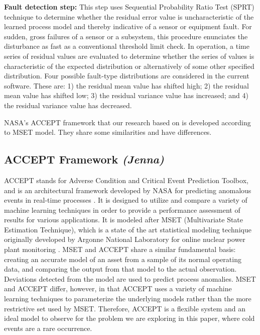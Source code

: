 \documentclass{acm_proc_article-sp}
\begin{document}
\textbf{Fault detection step:} This step uses Sequential Probability Ratio Test (SPRT) technique to determine whether the residual error value is uncharacteristic of the learned process model and thereby indicative of a sensor or equipment fault. For sudden, gross failures of a sensor or a subsystem, this procedure enunciates the disturbance as fast as a conventional threshold limit check.
In operation, a time series of residual values are evaluated to determine whether the series of values is characteristic of the expected distribution or alternatively of some other specified distribution. Four possible fault-type distributions are considered in the current software. These are: 1) the residual mean value has shifted high; 2) the residual mean value has shifted low; 3) the residual variance value has increased; and 4) the residual variance value has decreased. 

NASA's ACCEPT framework that our research based on is developed according to MSET model. They share some similarities and have differences. 

\subsection{ACCEPT Framework \textit{(Jenna)}}
ACCEPT stands for Adverse Condition and Critical Event Prediction Toolbox, and is an architectural  framework developed by NASA for predicting anomalous events in real-time processes \cite{accept}. It is designed to utilize and compare a variety of machine learning techniques in order to provide a performance assessment of results for various applications. It is modeled after MSET (Multivariate State Estimation Technique), which is a state of the art statistical modeling technique originally developed by Argonne National Laboratory for online nuclear power plant monitoring \cite{MSET}. MSET and ACCEPT share a similar fundamental basis: creating an accurate model of an asset from a sample of its normal operating data, and comparing the output from that model to the actual observation. Deviations detected from the model are used to predict process anomalies. MSET and ACCEPT differ, however, in that ACCEPT uses a variety of machine learning techniques to parameterize the underlying models rather than the more restrictive set used by MSET. Therefore, ACCEPT is a flexible system and an ideal model to observe for the problem we are exploring in this paper, where cold events are a rare occurrence.
\end{document}
